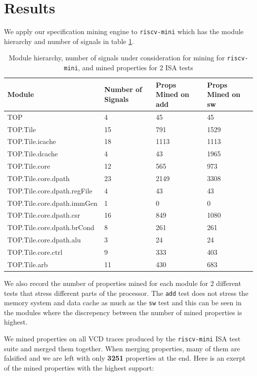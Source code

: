 \documentclass[acmlarge,11pt,nonacm]{acmart}
\begin{document}
\section{Results}
We apply our specification mining engine to \texttt{riscv-mini} which has the module hierarchy and number of signals in table \ref{tab:riscv-mini}.
\begin{table}
  \caption{Module hierarchy, number of signals under consideration for mining for \texttt{riscv-mini}, and mined properties for 2 ISA tests}
  \label{tab:riscv-mini}
  \begin{tabular}{llll}
    \toprule
    Module & Number of Signals & Props Mined on add & Props Mined on sw\\
    \midrule
    TOP & 4 & 45 & 45 \\
    TOP.Tile & 15 & 791 & 1529 \\
    TOP.Tile.icache & 18 & 1113 & 1113 \\
    TOP.Tile.dcache & 4 & 43 & 1965 \\
    TOP.Tile.core & 12 & 565 & 973 \\
    TOP.Tile.core.dpath & 23 & 2149 & 3308 \\
    TOP.Tile.core.dpath.regFile & 4 & 43 & 43\\
    TOP.Tile.core.dpath.immGen & 1 & 0 & 0 \\
    TOP.Tile.core.dpath.csr & 16 & 849 & 1080 \\
    TOP.Tile.core.dpath.brCond & 8 & 261 & 261\\
    TOP.Tile.core.dpath.alu & 3 & 24 & 24 \\
    TOP.Tile.core.ctrl & 9 & 333 & 403 \\
    TOP.Tile.arb & 11 & 430 & 683 \\
  \bottomrule
  \end{tabular}
\end{table}

We also record the number of properties mined for each module for 2 different tests that stress different parts of the processor.
The \texttt{add} test does not stress the memory system and data cache as much as the \texttt{sw} test and this can be seen in the modules where the discrepency between the number of mined properties is highest.

We mined properties on all VCD traces produced by the \texttt{riscv-mini} ISA test suite and merged them together.
When merging properties, many of them are falsified and we are left with only \textbf{3251} properties at the end.
Here is an exerpt of the mined properties with the highest support:
\end{document}
